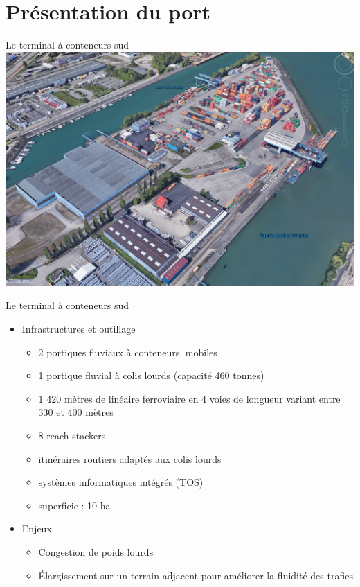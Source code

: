 \section{Présentation du port}

\begin{frame}{Le terminal à conteneurs sud}
  \includegraphics[width=\textwidth]{../images/image14}
\end{frame}

\begin{frame}{Le terminal à conteneurs sud}
  \begin{itemize}
  \item Infrastructures et outillage
    \begin{itemize}
    \item
      2 portiques fluviaux à conteneurs, mobiles
    \item
      1 portique fluvial à colis lourds (capacité 460 tonnes)
    \item
      1 420 mètres de linéaire ferroviaire en 4 voies de longueur variant entre 330 et 400 mètres
    \item
      8 reach-stackers
    \item
      itinéraires routiers adaptés aux colis lourds
    \item
      systèmes informatiques intégrés (TOS)
    \item
      superficie : 10 ha
    \end{itemize}
  \item Enjeux
    \begin{itemize}
    \item Congestion de poids lourds
    \item \'Elargissement sur un terrain adjacent pour améliorer la fluidité des trafics
    \end{itemize}
  \end{itemize}
\end{frame}

